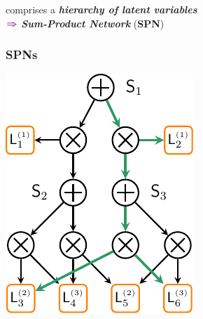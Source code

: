 \documentclass[xcolor={usenames,dvipsnames,svgnames}, compress, aspectratio=169, 11pt]{beamer}
\begin{document}
\begin{frame}[t, htt=bgrey2]
\begin{minipage}[t]{0.3\linewidth}
  \end{minipage}\begin{minipage}[t]{0.37\linewidth}
    \vspace{30pt}
    \raggedright
     comprises a
    \emph{\textbf{ hierarchy of latent variables}}\\[20pt]
    $\color{violet}\boldsymbol\Rightarrow$ \emph{\textbf{Sum-Product Network}} (\textbf{SPN})\\
  \end{minipage}

  
\end{frame}

\begin{frame}[t, htt=bgrey2]
  \frametitle{SPNs}

  \large
  \begin{minipage}[t]{0.25\linewidth}
    \vspace{15pt}
    \includegraphics[width=.9\linewidth]{figures/hspn}
  \end{minipage}%

\end{frame}
\end{document}
